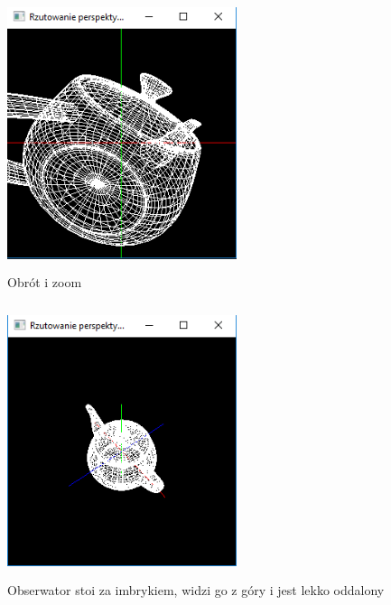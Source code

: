 \documentclass[a4paper,11pt]{article}
\begin{document}
    \begin{figure}[h!]
      \centering
      \includegraphics[width=0.6\textwidth,height=8cm]{obrotizoom.png}
      \caption{Obrót i zoom}
      \label{fig:zrzut1}
    \end{figure}

    \begin{figure}[h!]
      \centering
      \includegraphics[width=0.6\textwidth,height=8cm]{ostatni.png}
      \caption{Obserwator stoi za imbrykiem, widzi go z góry i jest lekko oddalony}
      \label{fig:zrzut1}
    \end{figure}
\end{document}
